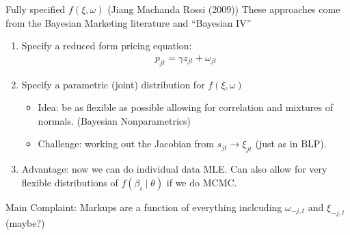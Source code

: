 \documentclass[aspectratio=169,10pt]{beamer}
\begin{document}
\begin{frame}{Fully specified $f(\xi,\omega)$ (Jiang Machanda Rossi (2009))}
These approaches come from the Bayesian Marketing literature and ``Bayesian IV''
\begin{enumerate}
    \item Specify a reduced form pricing equation:
    \begin{align*}
        p_{jt} = \gamma z_{jt}  + \omega_{jt}
    \end{align*}
    \item Specify a parametric (joint) distribution for $f(\xi, \omega)$
    \begin{itemize}
        \item Idea: be as flexible as possible allowing for correlation and mixtures of normals. (Bayesian Nonparametrics)
        \item Challenge: working out the Jacobian from $s_{jt} \rightarrow \xi_{jt}$ (just as in BLP).
    \end{itemize}
    \item Advantage: now we can do individual data MLE. Can also allow for very flexible distributions of $f(\beta_i \mid \theta)$ if we do MCMC.
\end{enumerate}
Main Complaint: Markups are a function of \alert{everything} inclcuding $\omega_{-j,t}$ and $\xi_{-j,t}$ (maybe?)
\end{frame}
\end{document}
